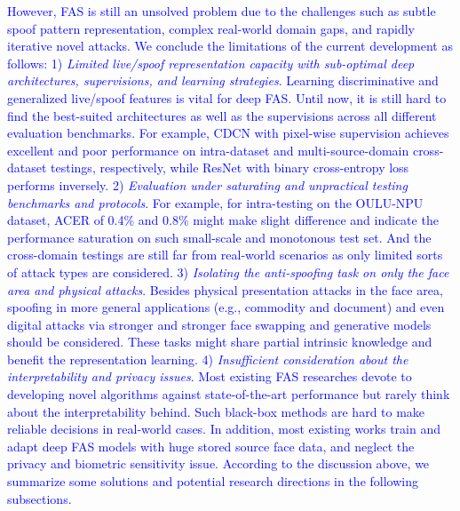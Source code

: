 \documentclass[10pt,journal,compsoc]{IEEEtran}
\begin{document}
\textcolor{blue}{However, FAS is still an unsolved problem due to the challenges such as subtle spoof pattern representation, complex real-world domain gaps, and rapidly iterative novel attacks. We conclude the limitations of the current development as follows: 1) \textit{Limited live/spoof representation capacity with sub-optimal deep architectures, supervisions, and learning strategies}. Learning discriminative and generalized live/spoof features is vital for deep FAS. Until now, it is still hard to find the best-suited architectures as well as the supervisions across all different evaluation benchmarks. For example, CDCN with pixel-wise supervision achieves excellent and poor performance on intra-dataset and multi-source-domain cross-dataset testings, respectively, while ResNet with binary cross-entropy loss performs inversely. 2) \textit{Evaluation under saturating and unpractical testing benchmarks and protocols}. For example, for intra-testing on the OULU-NPU dataset, ACER of 0.4\% and 0.8\% might make slight difference and indicate the performance saturation on such small-scale and monotonous test set. And the cross-domain testings are still far from real-world scenarios as only limited sorts of attack types are considered. 3) \textit{Isolating the anti-spoofing task on only the face area and physical attacks}. Besides physical presentation attacks in the face area, spoofing in more general applications (e.g., commodity and document) and even digital attacks via stronger and stronger face swapping and generative models should be considered. These tasks might share partial intrinsic knowledge and benefit the representation learning. 4) \textit{Insufficient consideration about the interpretability and privacy issues}. Most existing FAS researches devote to developing novel algorithms 
against state-of-the-art performance but rarely think about the interpretability behind. Such black-box methods are hard to make reliable decisions in real-world cases. In addition, most existing works train and adapt deep FAS models with huge stored source face data, and neglect the privacy and biometric sensitivity issue. According to the discussion above, we summarize some solutions and potential research directions in the following subsections.}









\vspace{-0.3em}
\end{document}
